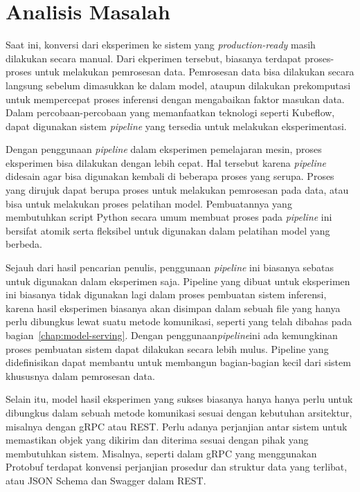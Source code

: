 \section{Analisis Masalah}

Saat ini, konversi dari eksperimen ke sistem yang \textit{production-ready} masih dilakukan secara manual.
Dari ekperimen tersebut, biasanya terdapat proses-proses untuk melakukan pemrosesan data.
Pemrosesan data bisa dilakukan secara langsung sebelum dimasukkan ke dalam model, ataupun dilakukan prekomputasi untuk mempercepat proses inferensi dengan mengabaikan faktor masukan data.
Dalam percobaan-percobaan yang memanfaatkan teknologi seperti Kubeflow, dapat digunakan sistem \textit{pipeline} yang tersedia untuk melakukan eksperimentasi.

Dengan penggunaan \textit{pipeline} dalam eksperimen pemelajaran mesin, proses eksperimen bisa dilakukan dengan lebih cepat.
Hal tersebut karena \textit{pipeline} didesain agar bisa digunakan kembali di beberapa proses yang serupa.
Proses yang dirujuk dapat berupa proses untuk melakukan pemrosesan pada data, atau bisa untuk melakukan proses pelatihan model.
Pembuatannya yang membutuhkan script Python secara umum membuat proses pada \textit{pipeline} ini bersifat atomik serta fleksibel untuk digunakan dalam pelatihan model yang berbeda.

Sejauh dari hasil pencarian penulis, penggunaan \textit{pipeline} ini biasanya sebatas  untuk digunakan dalam eksperimen saja.
Pipeline yang dibuat untuk eksperimen ini biasanya tidak digunakan lagi dalam proses pembuatan sistem inferensi, karena hasil eksperimen biasanya akan disimpan dalam sebuah file yang hanya perlu dibungkus lewat suatu metode komunikasi, seperti yang telah dibahas pada bagian~\ref{chap:model-serving}.
Dengan penggunaan\textit{pipeline}ini ada kemungkinan proses pembuatan sistem dapat dilakukan secara lebih mulus.
Pipeline yang didefinisikan dapat membantu untuk membangun bagian-bagian kecil dari sistem khususnya dalam pemrosesan data. 

Selain itu, model hasil eksperimen yang sukses biasanya hanya hanya perlu untuk dibungkus dalam sebuah metode komunikasi sesuai dengan kebutuhan arsitektur, misalnya dengan gRPC atau REST.\@
Perlu adanya perjanjian antar sistem untuk memastikan objek yang dikirim dan diterima sesuai dengan pihak yang membutuhkan sistem.
Misalnya, seperti dalam gRPC yang menggunakan Protobuf terdapat konvensi perjanjian prosedur dan struktur data yang terlibat, atau JSON Schema dan Swagger dalam REST.\@
